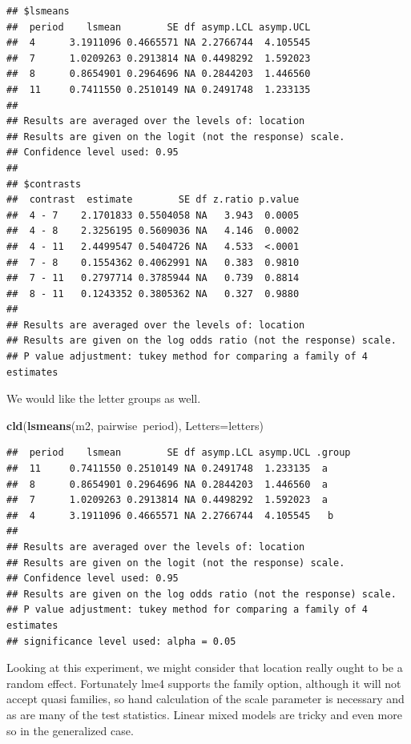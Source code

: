 \documentclass[]{book}
\newenvironment{Shaded}{\begin{snugshade}}{\end{snugshade}}
\newcommand{\KeywordTok}[1]{\textcolor[rgb]{0.13,0.29,0.53}{\textbf{{#1}}}}
\newcommand{\DataTypeTok}[1]{\textcolor[rgb]{0.13,0.29,0.53}{{#1}}}
\newcommand{\NormalTok}[1]{{#1}}
\theoremstyle{definition}
\theoremstyle{definition}
\theoremstyle{remark}
\begin{document}
\begin{verbatim}
## $lsmeans
##  period    lsmean        SE df asymp.LCL asymp.UCL
##  4      3.1911096 0.4665571 NA 2.2766744  4.105545
##  7      1.0209263 0.2913814 NA 0.4498292  1.592023
##  8      0.8654901 0.2964696 NA 0.2844203  1.446560
##  11     0.7411550 0.2510149 NA 0.2491748  1.233135
## 
## Results are averaged over the levels of: location 
## Results are given on the logit (not the response) scale. 
## Confidence level used: 0.95 
## 
## $contrasts
##  contrast  estimate        SE df z.ratio p.value
##  4 - 7    2.1701833 0.5504058 NA   3.943  0.0005
##  4 - 8    2.3256195 0.5609036 NA   4.146  0.0002
##  4 - 11   2.4499547 0.5404726 NA   4.533  <.0001
##  7 - 8    0.1554362 0.4062991 NA   0.383  0.9810
##  7 - 11   0.2797714 0.3785944 NA   0.739  0.8814
##  8 - 11   0.1243352 0.3805362 NA   0.327  0.9880
## 
## Results are averaged over the levels of: location 
## Results are given on the log odds ratio (not the response) scale. 
## P value adjustment: tukey method for comparing a family of 4 estimates
\end{verbatim}

We would like the letter groups as well.

\begin{Shaded}
\begin{Highlighting}[]
\KeywordTok{cld}\NormalTok{(}\KeywordTok{lsmeans}\NormalTok{(m2, pairwise~period), }\DataTypeTok{Letters=}\NormalTok{letters)}
\end{Highlighting}
\end{Shaded}

\begin{verbatim}
##  period    lsmean        SE df asymp.LCL asymp.UCL .group
##  11     0.7411550 0.2510149 NA 0.2491748  1.233135  a    
##  8      0.8654901 0.2964696 NA 0.2844203  1.446560  a    
##  7      1.0209263 0.2913814 NA 0.4498292  1.592023  a    
##  4      3.1911096 0.4665571 NA 2.2766744  4.105545   b   
## 
## Results are averaged over the levels of: location 
## Results are given on the logit (not the response) scale. 
## Confidence level used: 0.95 
## Results are given on the log odds ratio (not the response) scale. 
## P value adjustment: tukey method for comparing a family of 4 estimates 
## significance level used: alpha = 0.05
\end{verbatim}

Looking at this experiment, we might consider that location really ought
to be a random effect. Fortunately lme4 supports the family option,
although it will not accept quasi families, so hand calculation of the
scale parameter is necessary and as are many of the test statistics.
Linear mixed models are tricky and even more so in the generalized case.
\end{document}
